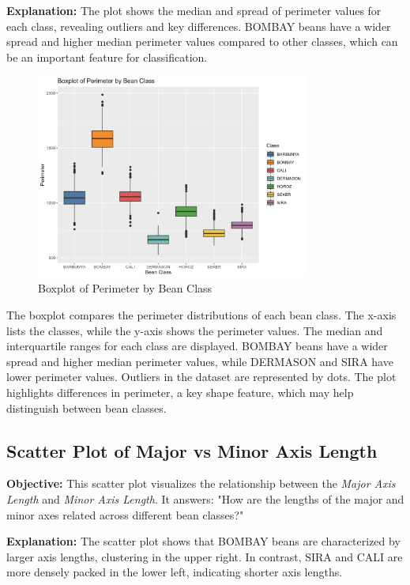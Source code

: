 \documentclass[a4paper,12pt]{article}
\begin{document}
\noindent\textbf{Explanation:} The plot shows the median and spread of perimeter values for each class, revealing outliers and key differences. BOMBAY beans have a wider spread and higher median perimeter values compared to other classes, which can be an important feature for classification.

\begin{figure}[H]
    \centering
    \includegraphics[width=0.8\textwidth]{graphs/boxplot_perimeter.png}
    \caption{Boxplot of Perimeter by Bean Class}
    \label{fig:boxplot_perimeter}
\end{figure}
The boxplot compares the perimeter distributions of each bean class. The x-axis lists the classes, while the y-axis shows the perimeter values. The median and interquartile ranges for each class are displayed. BOMBAY beans have a wider spread and higher median perimeter values, while DERMASON and SIRA have lower perimeter values. Outliers in the dataset are represented by dots. The plot highlights differences in perimeter, a key shape feature, which may help distinguish between bean classes.

\newpage
\subsection{Scatter Plot of Major vs Minor Axis Length}
\noindent\textbf{Objective:} This scatter plot visualizes the relationship between the \textit{Major Axis Length} and \textit{Minor Axis Length}. It answers: "How are the lengths of the major and minor axes related across different bean classes?"

\noindent\textbf{Explanation:} The scatter plot shows that BOMBAY beans are characterized by larger axis lengths, clustering in the upper right. In contrast, SIRA and CALI are more densely packed in the lower left, indicating shorter axis lengths.
\end{document}

